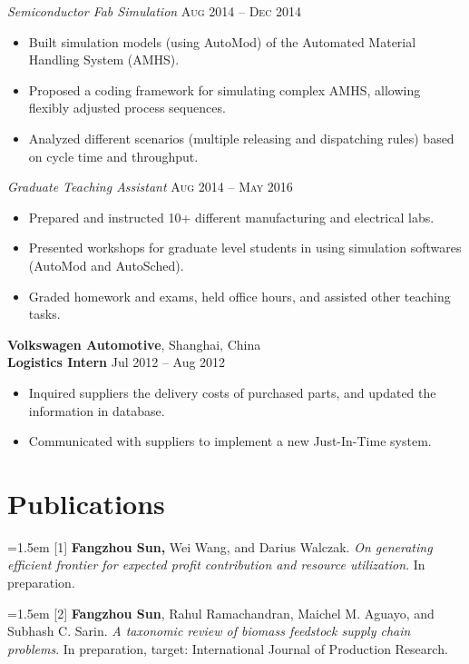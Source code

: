 \documentclass[letterpaper,10pt]{article}
\begin{document}
 

  
\textit{Semiconductor Fab Simulation} \hfill{\textsc{Aug 2014 -- Dec 2014}} 
\begin{itemize}
\item Built simulation models (using AutoMod) of the Automated Material Handling System (AMHS).
\item Proposed a coding framework for simulating complex AMHS, allowing flexibly adjusted process sequences.
\item Analyzed different scenarios (multiple releasing and dispatching rules) based on cycle time and throughput. 
\end{itemize}

  
\textit{Graduate Teaching Assistant} \hfill{\textsc{Aug 2014 -- May 2016}} 
\begin{itemize}
	\item Prepared and instructed 10+ different manufacturing and electrical labs.
	\item Presented workshops for graduate level students in using simulation softwares (AutoMod and AutoSched).
	\item Graded homework and exams, held office hours, and assisted other teaching tasks.
\end{itemize}



\medskip
\textbf{Volkswagen Automotive}, Shanghai, China  \\
\textbf{Logistics Intern} \hfill{Jul 2012 -- Aug 2012}
\begin{itemize}
  \item Inquired suppliers the delivery costs of purchased parts, and updated the information in database.
  \item Communicated with suppliers to implement a new Just-In-Time system.	
\end{itemize}



\section{Publications}
\hangindent=1.5em [1] \textbf{Fangzhou Sun,} Wei Wang, and Darius Walczak. \emph{On generating efficient frontier for expected profit contribution and resource utilization}. In preparation. 

\hangindent=1.5em [2] \textbf{Fangzhou Sun}, Rahul Ramachandran,  Maichel M. Aguayo, and Subhash C. Sarin. \emph{A taxonomic review of biomass feedstock supply chain problems}. In preparation, target: International Journal of Production Research.
\end{document}
